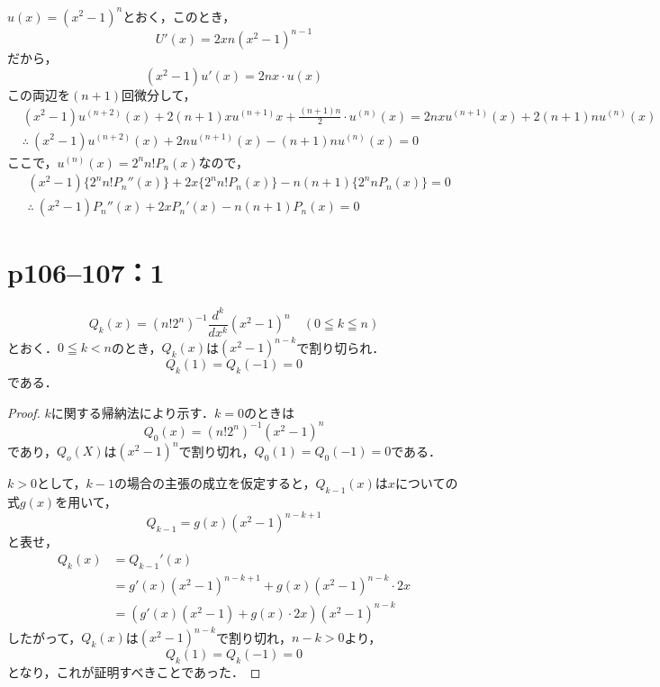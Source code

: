 \begin{tproof}
    $u(x)= (x^2-1)^n$とおく，このとき，
    \[
        U'(x)= 2x n(x^2-1)^{n-1}
    \]
    だから，
    \[
        (x^2-1) u'(x)=2nx \cdot u(x)
    \]
    この両辺を$(n+1)$回微分して，
    \begin{align*}
         & (x^2-1)u^{(n+2)}(x)+2(n+1)x u^{(n+1)} x + \frac{(n+1)n}{2} \cdot u^{(n)} (x) = 2nx u^{(n+1)}(x) + 2(n+1) n u^{(n)}(x) \\
         & \therefore ~(x^2-1)u^{(n+2)}(x) + 2n u^{(n+1)}(x)-(n+1)n u^{(n)}(x)=0
    \end{align*}
    ここで，$ u^{(n)} (x)= 2^n n! P_n (x)$なので，
    \begin{align*}
         & (x^2 -1) \{ 2^n n! P_n ''(x) \} +2x \{ 2^n n! P_n (x) \} -n(n+1) \{ 2^n n P_n(x) \} =0 \\
         & \therefore ~ (x^2-1) P_n ''(x)+2x P_n '(x) -n(n+1) P_n (x)=0
    \end{align*}
\end{tproof}


\section*{p106--107：1}

\begin{lemma}{}{}
    \[
        Q_k (x)= (n! 2^n)^{-1} \frac{d^k}{dx^k} (x^2-1)^n \quad (0 \leqq k \leqq n)
    \]
    とおく．$0 \leqq k <n$のとき，$Q_k (x)$は$(x^2-1)^{n-k}$で割り切られ．
    \[
        Q_k (1)= Q_k(-1)=0
    \]
    である．
\end{lemma}

\begin{proof}
    $k$に関する帰納法により示す．$k=0$のときは
    \[
        Q_0(x)= (n! 2^n)^{-1} (x^2-1)^n
    \]
    であり，$Q_o(X)$は$(x^2-1)^n$で割り切れ，$Q_0(1)=Q_0(-1)=0$である．

    $k>0$として，$k-1$の場合の主張の成立を仮定すると，$Q_{k-1}(x)$は$x$についての式$g(x)$を用いて，
    \[
        Q_{k-1} = g(x)(x^2-1)^{n-k+1}
    \]
    と表せ，
    \begin{align*}
        Q_k (x) & =Q_{k-1}' (x)                                        \\
                & = g'(x)(x^2-1)^{n-k+1} + g(x) (x^2-1)^{n-k} \cdot 2x \\
                & =(g'(x)(x^2-1)+g(x) \cdot 2x) (x^2-1)^{n-k}
    \end{align*}
    したがって，$Q_k(x)$は$(x^2-1)^{n-k}$で割り切れ，$n-k >0$より，
    \[
        Q_k (1)= Q_k(-1)=0
    \]
    となり，これが証明すべきことであった．
\end{proof}


